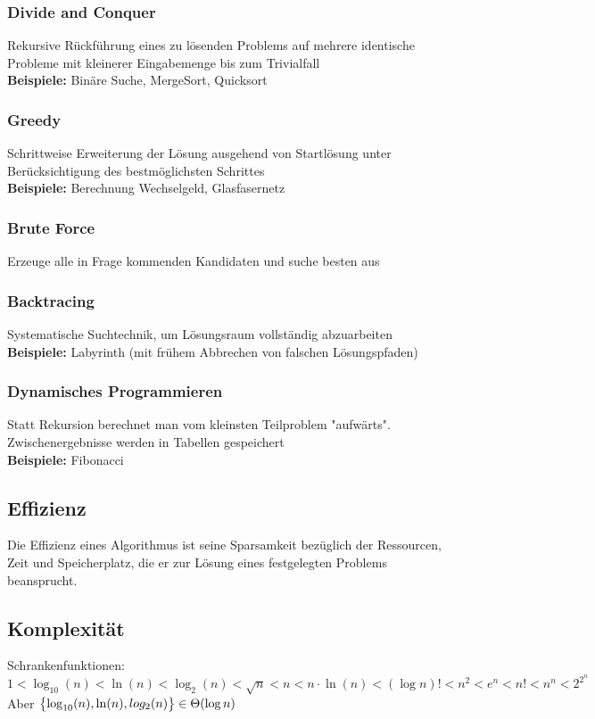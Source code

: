 \documentclass[fs, footer]{latex4ei}
\begin{document}
\begin{multicols*}{4}
\subsubsection{Divide and Conquer}
Rekursive Rückführung eines zu lösenden Problems auf mehrere identische Probleme mit kleinerer Eingabemenge bis zum Trivialfall\\
\textbf{Beispiele:} Binäre Suche, MergeSort, Quicksort
\subsubsection{Greedy}
Schrittweise Erweiterung der Lösung ausgehend von Startlösung unter Berücksichtigung des bestmöglichsten Schrittes\\
\textbf{Beispiele:} Berechnung Wechselgeld, Glasfasernetz
\subsubsection{Brute Force}
Erzeuge alle in Frage kommenden Kandidaten und suche besten aus\\
\subsubsection{Backtracing}
Systematische Suchtechnik, um Lösungsraum vollständig abzuarbeiten\\
\textbf{Beispiele:} Labyrinth (mit frühem Abbrechen von falschen Lösungspfaden)
\subsubsection{Dynamisches Programmieren}
Statt Rekursion berechnet man vom kleinsten Teilproblem "aufwärts". Zwischenergebnisse werden in Tabellen gespeichert\\
\textbf{Beispiele:} Fibonacci
\subsection{Effizienz}
Die Effizienz eines Algorithmus ist seine Sparsamkeit bezüglich der Ressourcen, Zeit und Speicherplatz, die er zur Lösung eines festgelegten Problems beansprucht.

\subsection{Komplexität}
Schrankenfunktionen:
$1<\log_{10}(n)<\ln(n)<\log_2(n)<\sqrt{n}<n<n\cdot \ln(n)<(\log n)! <n^2 < e^n < n! < n^n < 2^{2^n}$
Aber $\bigl\{\log_{10}(n), \ln (n), log_2 (n)\bigr\} \in \Theta(\log n)$


\end{multicols*}
\end{document}
